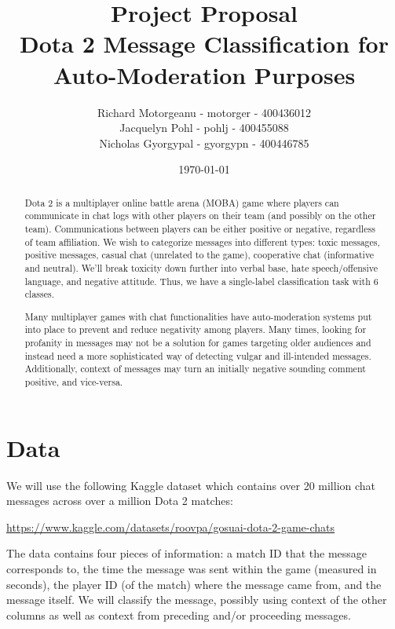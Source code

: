 \documentclass[11pt, letterpaper, notitlepage]{Article}
\title{Project Proposal \\ Dota 2 Message Classification for Auto-Moderation Purposes}
\author{Richard Motorgeanu - motorger - 400436012\\ Jacquelyn Pohl - pohlj - 400455088\\ Nicholas Gyorgypal - gyorgypn - 400446785}
\date{\today}
\begin{document}
\maketitle

\vspace{4em}

\begin{abstract}

   Dota 2 is a multiplayer online battle arena (MOBA) game where players can communicate in chat logs  with other players on their team (and possibly on the other team). Communications between players can be either positive or negative, regardless of team affiliation. We wish to categorize messages into different types: toxic messages, positive messages, casual chat (unrelated to the game), cooperative chat (informative and neutral). We'll break toxicity down further into verbal base, hate speech/offensive language, and negative attitude. Thus, we have a single-label classification task with 6 classes.
   
   Many multiplayer games with chat functionalities have auto-moderation systems put into place to prevent and reduce negativity among players. Many times, looking for profanity in messages may not be a solution for games targeting older audiences and instead need a more sophisticated way of detecting vulgar and ill-intended messages. Additionally, context of messages may turn an initially negative sounding comment positive, and vice-versa.
   
\end{abstract}
   
\newpage
   
\section[1]{Data}

	We will use the following Kaggle dataset which contains over 20 million chat messages across over a million Dota 2 matches: 
	
\begin{center}
\href{https://www.kaggle.com/datasets/romovpa/gosuai-dota-2-game-chats}{https://www.kaggle.com/datasets/roovpa/gosuai-dota-2-game-chats}
\end{center}
	
	The data contains four pieces of information: a match ID that the message corresponds to, the time the message was sent within the game (measured in seconds), the player ID (of the match) where the message came from, and the message itself. We will classify the message, possibly using context of the other columns as well as context from preceding and/or proceeding messages.
	
\end{document}
